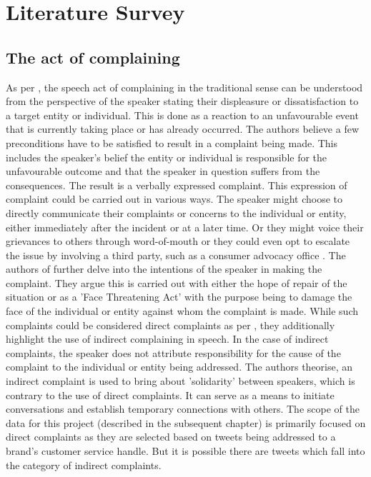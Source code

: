 \chapter{Literature Survey}

\section{The act of complaining}

As per \cite{olshtain_speechact_1987}, the speech act of complaining in the traditional sense can be understood from the perspective of the speaker stating their displeasure or dissatisfaction to a target entity or individual. This is done as a reaction to an unfavourable event that is currently taking place or has already occurred. The authors believe a few preconditions have to be satisfied to result in a complaint being made. This includes the speaker's belief the entity or individual is responsible for the unfavourable outcome and that the speaker in question suffers from the consequences. The result is a verbally expressed complaint. 
\newline \newline
This expression of complaint could be carried out in various ways. The speaker might choose to directly communicate their complaints or concerns to the individual or entity, either immediately after the incident or at a later time. Or they might voice their grievances to others through word-of-mouth or they could even opt to escalate the issue by involving a third party, such as a consumer advocacy office \cite{sparksComplainingCyberspaceMotives2010}.
\newline\newline
The authors of \cite{olshtain_speechact_1987} further delve into the intentions of the speaker in making the complaint. They argue this is carried out with either the hope of repair of the situation or as a 'Face Threatening Act' with the purpose being to damage the face of the individual or entity against whom the complaint is made.
\newline \newline
While such complaints could be considered direct complaints as per \cite{boxerSocialDistanceSpeech1993}, they additionally highlight the use of indirect complaining in speech. In the case of indirect complaints, the speaker does not attribute responsibility for the cause of the complaint to the individual or entity being addressed. The authors theorise, an indirect complaint is used to bring about 'solidarity' between speakers, which is contrary to the use of direct complaints. It can serve as a means to initiate conversations and establish temporary connections with others. The scope of the data for this project (described in the subsequent chapter) is primarily focused on direct complaints as they are selected based on tweets being addressed to a brand's customer service handle. But it is possible there are tweets which fall into the category of indirect complaints.
